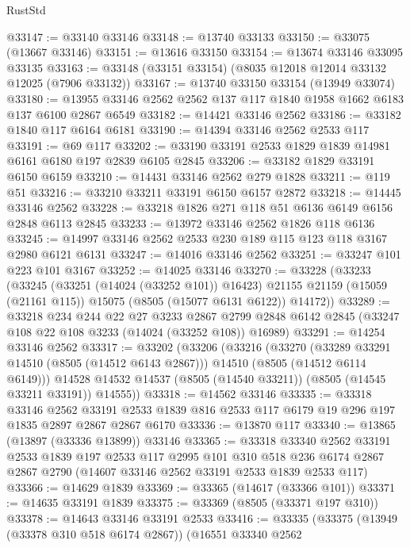 \begin{lexlean}{RustStd}
\begin{coremodule}
@33147 := @33140 @33146
@33148 := @13740 @33133
@33150 := @33075 (@13667 @33146)
@33151 := @13616 @33150
@33154 := @13674 @33146 @33095 @33135
@33163 := @33148 (@33151 @33154) (@8035 @12018 @12014 @33132 @12025 (@7906 @33132))
@33167 := @13740 @33150 @33154 (@13949 @33074)
@33180 := @13955 @33146 @2562 @2562 @137 @117 @1840 @1958 @1662 @6183 @137 @6100 @2867 @6549
@33182 := @14421 @33146 @2562
@33186 := @33182 @1840 @117 @6164 @6181
@33190 := @14394 @33146 @2562 @2533 @117
@33191 := @69 @117
@33202 := @33190 @33191 @2533 @1829 @1839 @14981 @6161 @6180 @197 @2839 @6105 @2845
@33206 := @33182 @1829 @33191 @6150 @6159
@33210 := @14431 @33146 @2562 @279 @1828
@33211 := @119 @51
@33216 := @33210 @33211 @33191 @6150 @6157 @2872
@33218 := @14445 @33146 @2562
@33228 := @33218 @1826 @271 @118 @51 @6136 @6149 @6156 @2848 @6113 @2845
@33233 := @13972 @33146 @2562 @1826 @118 @6136
@33245 := @14997 @33146 @2562 @2533 @230 @189 @115 @123 @118 @3167 @2980 @6121 @6131
@33247 := @14016 @33146 @2562
@33251 := @33247 @101 @223 @101 @3167
@33252 := @14025 @33146
@33270 := @33228
    (@33233
      (@33245
        (@33251 (@14024 (@33252 @101)) @16423)
        @21155
        @21159
        (@15059 (@21161 @115))
        @15075
        (@8505 (@15077 @6131 @6122))
        @14172))
@33289 := @33218
    @234
    @244
    @22
    @27
    @3233
    @2867
    @2799
    @2848
    @6142
    @2845
    (@33247 @108 @22 @108 @3233 (@14024 (@33252 @108)) @16989)
@33291 := @14254 @33146 @2562
@33317 := @33202
    (@33206
      (@33216
        (@33270
          (@33289 @33291 @14510 (@8505 (@14512 @6143 @2867)))
          @14510
          (@8505 (@14512 @6114 @6149)))
        @14528
        @14532
        @14537
        (@8505 (@14540 @33211))
        (@8505 (@14545 @33211 @33191))
        @14555))
@33318 := @14562 @33146
@33335 := @33318
    @33146
    @2562
    @33191
    @2533
    @1839
    @816
    @2533
    @117
    @6179
    @19
    @296
    @197
    @1835
    @2897
    @2867
    @2867
    @6170
@33336 := @13870 @117
@33340 := @13865 (@13897 (@33336 @13899)) @33146
@33365 := @33318
    @33340
    @2562
    @33191
    @2533
    @1839
    @197
    @2533
    @117
    @2995
    @101
    @310
    @518
    @236
    @6174
    @2867
    @2867
    @2790
    (@14607 @33146 @2562 @33191 @2533 @1839 @2533 @117)
@33366 := @14629 @1839
@33369 := @33365 (@14617 (@33366 @101))
@33371 := @14635 @33191 @1839
@33375 := @33369 (@8505 (@33371 @197 @310))
@33378 := @14643 @33146 @33191 @2533
@33416 := @33335
    (@33375
      (@13949 (@33378 @310 @518 @6174 @2867))
      (@16551
        @33340
        @2562

\end{coremodule}
\end{lexlean}

